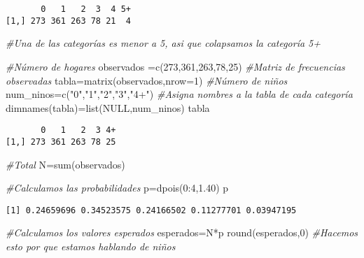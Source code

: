 \documentclass[
  a4paper,
  oneside,
  openany]{book}
\newenvironment{Shaded}{\begin{snugshade}}{\end{snugshade}}
\newcommand{\AttributeTok}[1]{\textcolor[rgb]{0.77,0.63,0.00}{#1}}
\newcommand{\CommentTok}[1]{\textcolor[rgb]{0.56,0.35,0.01}{\textit{#1}}}
\newcommand{\ConstantTok}[1]{\textcolor[rgb]{0.00,0.00,0.00}{#1}}
\newcommand{\DecValTok}[1]{\textcolor[rgb]{0.00,0.00,0.81}{#1}}
\newcommand{\FloatTok}[1]{\textcolor[rgb]{0.00,0.00,0.81}{#1}}
\newcommand{\FunctionTok}[1]{\textcolor[rgb]{0.00,0.00,0.00}{#1}}
\newcommand{\NormalTok}[1]{#1}
\newcommand{\OtherTok}[1]{\textcolor[rgb]{0.56,0.35,0.01}{#1}}
\newcommand{\SpecialCharTok}[1]{\textcolor[rgb]{0.00,0.00,0.00}{#1}}
\newcommand{\StringTok}[1]{\textcolor[rgb]{0.31,0.60,0.02}{#1}}
\begin{document}
\begin{verbatim}
       0   1   2  3  4 5+
[1,] 273 361 263 78 21  4
\end{verbatim}

\begin{Shaded}
\begin{Highlighting}[]
\CommentTok{\#Una de las categorías es menor a 5, asi que colapsamos la categoría 5+}

\CommentTok{\#Número de hogares}
\NormalTok{observados }\OtherTok{=}\FunctionTok{c}\NormalTok{(}\DecValTok{273}\NormalTok{,}\DecValTok{361}\NormalTok{,}\DecValTok{263}\NormalTok{,}\DecValTok{78}\NormalTok{,}\DecValTok{25}\NormalTok{)}
\CommentTok{\#Matriz de frecuencias observadas}
\NormalTok{tabla}\OtherTok{=}\FunctionTok{matrix}\NormalTok{(observados,}\AttributeTok{nrow=}\DecValTok{1}\NormalTok{)}
\CommentTok{\#Número de niños}
\NormalTok{num\_ninos}\OtherTok{=}\FunctionTok{c}\NormalTok{(}\StringTok{"0"}\NormalTok{,}\StringTok{"1"}\NormalTok{,}\StringTok{"2"}\NormalTok{,}\StringTok{"3"}\NormalTok{,}\StringTok{"4+"}\NormalTok{)}
\CommentTok{\#Asigna nombres a la tabla de cada categoría}
\FunctionTok{dimnames}\NormalTok{(tabla)}\OtherTok{=}\FunctionTok{list}\NormalTok{(}\ConstantTok{NULL}\NormalTok{,num\_ninos)}
\NormalTok{tabla}
\end{Highlighting}
\end{Shaded}

\begin{verbatim}
       0   1   2  3 4+
[1,] 273 361 263 78 25
\end{verbatim}

\begin{Shaded}
\begin{Highlighting}[]
\CommentTok{\#Total}
\NormalTok{N}\OtherTok{=}\FunctionTok{sum}\NormalTok{(observados)}

\CommentTok{\#Calculamos las probabilidades}
\NormalTok{p}\OtherTok{=}\FunctionTok{dpois}\NormalTok{(}\DecValTok{0}\SpecialCharTok{:}\DecValTok{4}\NormalTok{,}\FloatTok{1.40}\NormalTok{)}
\NormalTok{p}
\end{Highlighting}
\end{Shaded}

\begin{verbatim}
[1] 0.24659696 0.34523575 0.24166502 0.11277701 0.03947195
\end{verbatim}

\begin{Shaded}
\begin{Highlighting}[]
\CommentTok{\#Calculamos los valores esperados}
\NormalTok{esperados}\OtherTok{=}\NormalTok{N}\SpecialCharTok{*}\NormalTok{p}
\FunctionTok{round}\NormalTok{(esperados,}\DecValTok{0}\NormalTok{) }\CommentTok{\#Hacemos esto por que estamos hablando de niños}
\end{Highlighting}
\end{Shaded}
\end{document}
